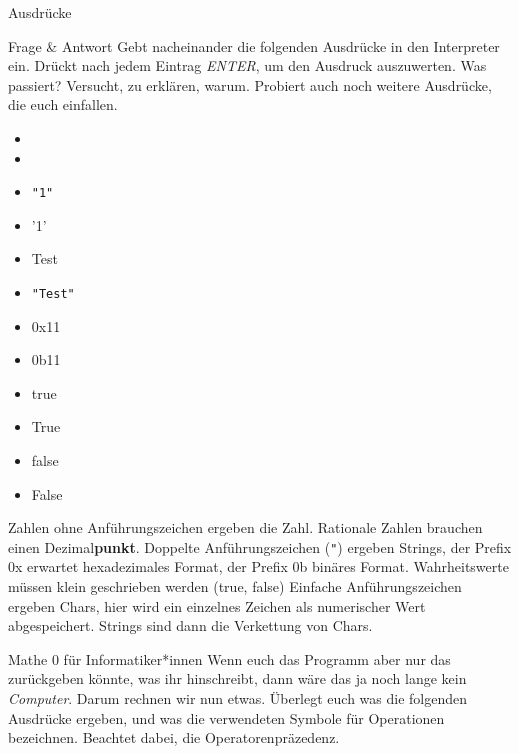 \begin{task}[points=auto]{Ausdrücke }
    \begin{subtask*}[points=0]{Frage \& Antwort}
        Gebt nacheinander die folgenden Ausdrücke in den Interpreter ein. Drückt nach
        jedem Eintrag \textit{ENTER}, um den Ausdruck auszuwerten. Was passiert?
        Versucht, zu erklären, warum. Probiert auch noch weitere Ausdrücke, die euch
        einfallen.

        \begin{multicols}{3}
            \begin{itemize}
                \item {}
                \item {}
                \item {\ttfamily \verb="1"=}
                \item {\ttfamily '1'}
                \item {\ttfamily Test}
                \item {\ttfamily \verb="Test"=}
                \item {\ttfamily 0x11}
                \item {\ttfamily 0b11}
                \item {\ttfamily true}
                \item {\ttfamily True}
                \item {\ttfamily false}
                \item {\ttfamily False}
            \end{itemize}
        \end{multicols}


        \begin{solution}
            Zahlen ohne Anführungszeichen ergeben die Zahl. Rationale Zahlen brauchen einen
            Dezimal\textbf{punkt}. Doppelte Anführungszeichen ({\ttfamily \verb+"+}) ergeben Strings,
            der Prefix {\ttfamily 0x} erwartet hexadezimales Format, der Prefix {\ttfamily 0b}
            binäres Format. Wahrheitswerte müssen klein geschrieben werden ({\ttfamily true},
            {\ttfamily false})
            Einfache Anführungszeichen ergeben Chars, hier wird ein einzelnes Zeichen als numerischer Wert abgespeichert.
            Strings sind dann die Verkettung von Chars.
        \end{solution}
    \end{subtask*}
    \begin{subtask*}[points=0]{Mathe 0 für Informatiker*innen}
        Wenn euch das Programm aber nur das zurückgeben könnte, was ihr hinschreibt,
        dann wäre das ja noch lange kein \textit{Computer}. Darum rechnen wir nun etwas.
        Überlegt euch was die folgenden Ausdrücke ergeben, und was die verwendeten
        Symbole für Operationen bezeichnen. Beachtet dabei, die Operatorenpräzedenz.


\end{subtask*}
\end{task}
